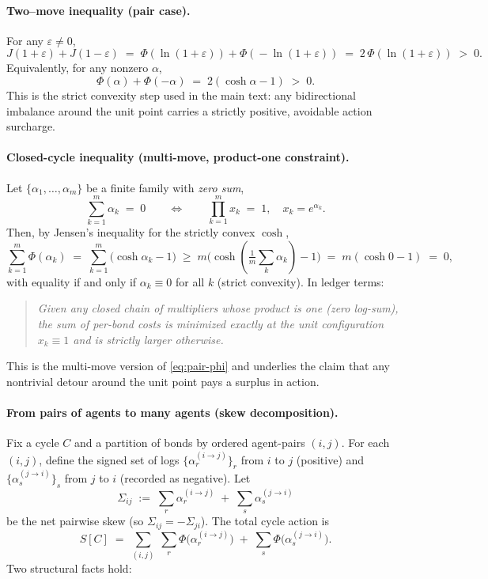 \documentclass[11pt]{article}
\begin{document}
\paragraph{Two–move inequality (pair case).}
For any $\varepsilon\neq 0$,
\[
J(1+\varepsilon)+J(1-\varepsilon)\;=\;\Phi(\ln(1+\varepsilon))+\Phi(\!-\ln(1+\varepsilon))\;=\;2\,\Phi(\ln(1+\varepsilon))\;>\;0.
\]
Equivalently, for any nonzero $\alpha$,
\begin{equation}
\Phi(\alpha)+\Phi(-\alpha)\;=\;2(\cosh\alpha-1)\;>\;0.
\label{eq:pair-phi}
\end{equation}
This is the strict convexity step used in the main text: any bidirectional imbalance around the unit point carries a strictly positive, avoidable action surcharge.

\paragraph{Closed-cycle inequality (multi-move, product-one constraint).}
Let $\{\alpha_1,\dots,\alpha_m\}$ be a finite family with \emph{zero sum},
\[
\sum_{k=1}^{m}\alpha_k\;=\;0
\qquad\Longleftrightarrow\qquad
\prod_{k=1}^{m} x_k\;=\;1,\quad x_k=e^{\alpha_k}.
\]
Then, by Jensen’s inequality for the strictly convex $\cosh$,
\[
\sum_{k=1}^{m}\Phi(\alpha_k)
\;=\;\sum_{k=1}^{m}\big(\cosh\alpha_k-1\big)
\;\ge\; m\big(\cosh(\tfrac{1}{m}\sum_k \alpha_k)-1\big)
\;=\; m(\cosh 0-1)\;=\;0,
\]
with equality if and only if $\alpha_k\equiv 0$ for all $k$ (strict convexity). In ledger terms:

\begin{quote}
\emph{Given any closed chain of multipliers whose product is one (zero log-sum), the sum of per-bond costs is minimized exactly at the unit configuration $x_k\equiv 1$ and is strictly larger otherwise.}
\end{quote}

This is the multi-move version of \eqref{eq:pair-phi} and underlies the claim that any nontrivial detour around the unit point pays a surplus in action.

\paragraph{From pairs of agents to many agents (skew decomposition).}
Fix a cycle $C$ and a partition of bonds by ordered agent-pairs $(i,j)$. For each $(i,j)$, define the signed set of logs $\{\alpha^{(i\to j)}_r\}_{r}$ from $i$ to $j$ (positive) and $\{\alpha^{(j\to i)}_s\}_{s}$ from $j$ to $i$ (recorded as negative). Let
\[
\Sigma_{ij}\;:=\;\sum_{r}\alpha^{(i\to j)}_r\;+\;\sum_{s}\alpha^{(j\to i)}_s
\]
be the net pairwise skew (so $\Sigma_{ij}=-\Sigma_{ji}$). The total cycle action is
\[
S[C]\;=\;\sum_{(i,j)}\ \sum_{r}\Phi\!\big(\alpha^{(i\to j)}_r\big)\;+\;\sum_{s}\Phi\!\big(\alpha^{(j\to i)}_s\big).
\]
Two structural facts hold:
\end{document}
